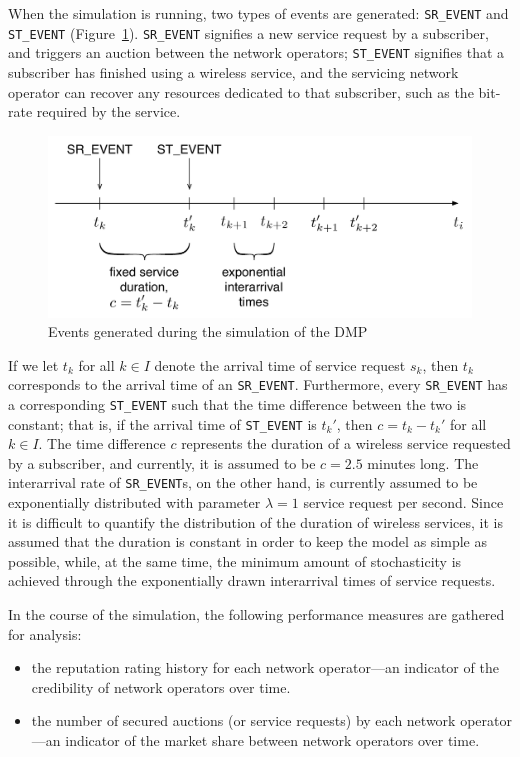 When the simulation is running, two types of events are generated: \lstinline{SR_EVENT} and \lstinline{ST_EVENT} (Figure~\ref{fig:dm_events_dynamic}). \lstinline{SR_EVENT} signifies a new service request by a subscriber, and triggers an auction between the network operators; \lstinline{ST_EVENT} signifies that a subscriber has finished using a wireless service, and the servicing network operator can recover any resources dedicated to that subscriber, such as the bit-rate required by the service.
\begin{figure}[t]
	\includegraphics[width=\figsize]{3/Figures/dm_events}
	\caption{Events generated during the simulation of the DMP}
	\label{fig:dm_events_dynamic}
\end{figure}
If we let $t_k$ for all $k\in I$ denote the arrival time of service request $s_k$, then $t_k$ corresponds to the arrival time of an \lstinline{SR_EVENT}. Furthermore, every \lstinline{SR_EVENT} has a corresponding \lstinline{ST_EVENT} such that the time difference between the two is constant; that is, if the arrival time of \lstinline{ST_EVENT} is $t_k'$, then $c = t_k - t_k'$ for all $k\in I$. The time difference $c$ represents the duration of a wireless service requested by a subscriber, and currently, it is assumed to be $c=2.5$ minutes long. The interarrival rate of \lstinline{SR_EVENT}s, on the other hand, is currently assumed to be exponentially distributed with parameter $\lambda=1$ service request per second. Since it is difficult to quantify the distribution of the duration of wireless services, it is assumed that the duration is constant in order to keep the model as simple as possible, while, at the same time, the minimum amount of stochasticity is achieved through the exponentially drawn interarrival times of service requests.

In the course of the simulation, the following performance measures are gathered for analysis:
\begin{itemize}
	\item the reputation rating history for each network operator---an indicator of the credibility of network operators over time.
	\item the number of secured auctions (or service requests) by each network operator---an indicator of the market share between network operators over time.
\end{itemize}

